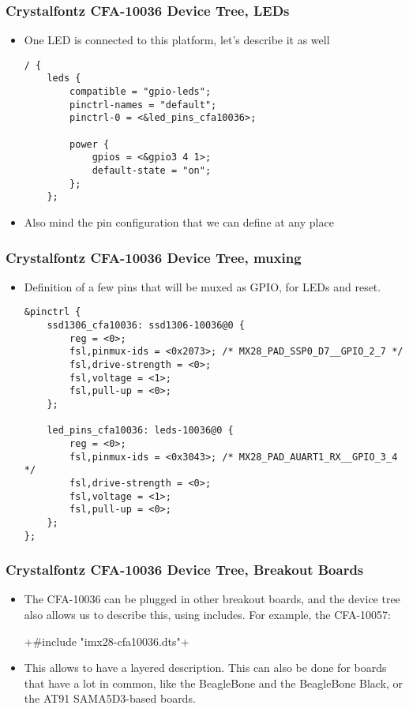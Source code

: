 \begin{frame}[fragile]
  \frametitle{Crystalfontz CFA-10036 Device Tree, LEDs}
  \begin{itemize}
  \item One LED is connected to this platform, let's describe it as well
    \begin{block}{}
      \begin{verbatim}
/ {
    leds {
        compatible = "gpio-leds";
        pinctrl-names = "default";
        pinctrl-0 = <&led_pins_cfa10036>;

        power {
            gpios = <&gpio3 4 1>;
            default-state = "on";
        };
    };
      \end{verbatim}
    \end{block}
  \item Also mind the pin configuration that we can define at any place
  \end{itemize}
\end{frame}

\begin{frame}[fragile]
  \frametitle{Crystalfontz CFA-10036 Device Tree, muxing}
  \begin{itemize}
  \item Definition of a few pins that will be muxed as GPIO, for LEDs and reset.
    \begin{block}{}
      \begin{verbatim}
&pinctrl {
    ssd1306_cfa10036: ssd1306-10036@0 {
        reg = <0>;
        fsl,pinmux-ids = <0x2073>; /* MX28_PAD_SSP0_D7__GPIO_2_7 */
        fsl,drive-strength = <0>;
        fsl,voltage = <1>;
        fsl,pull-up = <0>;
    };

    led_pins_cfa10036: leds-10036@0 {
        reg = <0>;
        fsl,pinmux-ids = <0x3043>; /* MX28_PAD_AUART1_RX__GPIO_3_4 */
        fsl,drive-strength = <0>;
        fsl,voltage = <1>;
        fsl,pull-up = <0>;
    };
};
      \end{verbatim}
    \end{block}
  \end{itemize}
\end{frame}

\begin{frame}[fragile]
  \frametitle{Crystalfontz CFA-10036 Device Tree, Breakout Boards}
  \begin{itemize}
  \item The CFA-10036 can be plugged in other breakout boards, and the
    device tree also allows us to describe this, using includes. For
    example, the CFA-10057:
    \begin{block}{}
      +#include "imx28-cfa10036.dts"+
    \end{block}
  \item This allows to have a layered description. This can also be
    done for boards that have a lot in common, like the BeagleBone and
    the BeagleBone Black, or the AT91 SAMA5D3-based boards.
  \end{itemize}
\end{frame}

